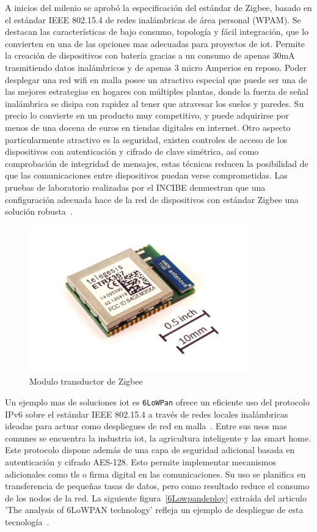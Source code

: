  A inicios del milenio se aprobó la especificación del estándar de Zigbee, basado en el estándar IEEE 802.15.4 de redes inalámbricas de área personal (WPAM). Se destacan las características de bajo consumo, topología y fácil integración, que lo convierten en una de las opciones mas adecuadas para proyectos de \gls{iot}. Permite la creación de dispositivos con batería gracias a un consumo de apenas 30mA  trasmitiendo datos inalámbricos y de apenas 3 micro Amperios en reposo. Poder desplegar una red \gls{wifi} en malla posee un atractivo especial que puede ser una de las mejores estrategias en hogares con múltiples plantas, donde la fuerza de señal inalámbrica se disipa con rapidez al tener que atravesar los suelos y paredes. Su precio lo convierte en un producto muy competitivo, y puede adquirirse por menos de una docena de euros en tiendas digitales en internet. Otro aspecto particularmente atractivo es la seguridad, existen controles de acceso de los dispositivos con autenticación y cifrado de clave simétrica, así como comprobación de integridad de mensajes, estas técnicas reducen la posibilidad de que las comunicaciones entre dispositivos puedan verse comprometidas. Las pruebas de laboratorio realizadas por el INCIBE demuestran que una configuración adecuada hace de la red de dispositivos con estándar Zigbee una solución robusta~\cite{incibe_zigbee}.
 
\begin{figure}[hbt!]
\centering
\includegraphics[height=2.5in]{figures/ETRX357_ZigBee_module_with_size_ref.jpg}
\caption[Modulo transductor de 2.4Gh Zigbee ETRX357]{Modulo transductor de Zigbee\footnotemark}
\end{figure}

\vspace{1cm}

Un ejemplo mas de soluciones \gls{iot} es \verb|6LoWPan| ofrece un eficiente uso del protocolo IPv6 sobre el estándar IEEE 802.15.4 a través de redes locales inalámbricas ideadas para actuar como despliegues de red en malla~\cite{montenegro2007rfc}. Entre sus usos mas comunes se encuentra la industria \gls{iot}, la agricultura inteligente y las smart home. Este protocolo dispone además de una capa de seguridad adicional basada en autenticación y cifrado AES-128. Esto permite implementar mecanismos adicionales como \gls{tls} o firma digital en las comunicaciones. Su uso se planifica en transferencia de pequeñas tasas de datos, pero como resultado reduce el consumo de los nodos de la red. La siguiente figura~\ref{6Lowpandeploy} extraída del articulo 'The analysis of 6LoWPAN technology' refleja un ejemplo de despliegue de esta tecnología~\cite{ma2008analysis}.

